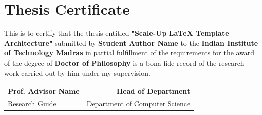 \chapter*{Thesis Certificate}
This is to certify that the thesis entitled \textbf{"Scale-Up LaTeX Template Architecture"} submitted by \textbf{Student Author Name} to the \textbf{Indian Institute of Technology Madras} in partial fulfillment of the requirements for the award of the degree of \textbf{Doctor of Philosophy} is a bona fide record of the research work carried out by him under my supervision.

\vspace{2cm}
\noindent
\begin{tabular*}{\textwidth}{@{\extracolsep{\fill}}lr}
    \textbf{Prof. Advisor Name} & \textbf{Head of Department} \\
    Research Guide & Department of Computer Science
\end{tabular*}

